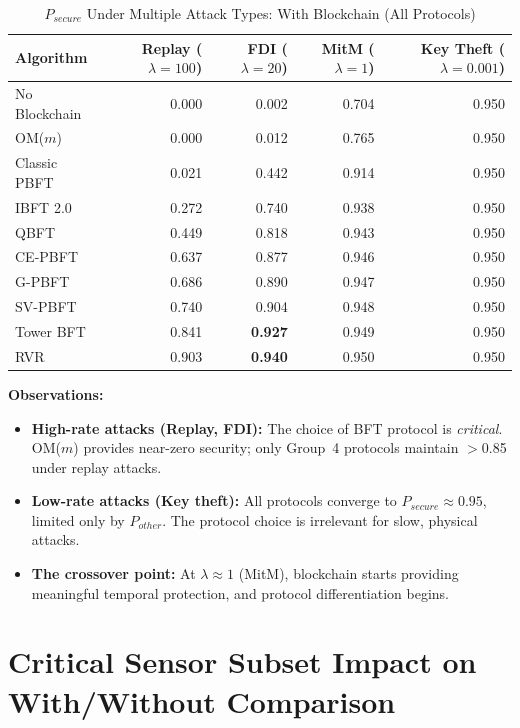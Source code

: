 \documentclass[10pt,twocolumn,letterpaper]{article}
\begin{document}
\begin{table}[t]
\caption{$P_{secure}$ Under Multiple Attack Types: With Blockchain (All Protocols)}
\label{tab:multi_attack}
\centering
\scriptsize
\begin{tabular}{@{}lrrrr@{}}
\toprule
\textbf{Algorithm} & \textbf{Replay ($\lambda=100$)} & \textbf{FDI ($\lambda=20$)} & \textbf{MitM ($\lambda=1$)} & \textbf{Key Theft ($\lambda=0.001$)} \\
\midrule
No Blockchain & 0.000 & 0.002 & 0.704 & 0.950 \\
\midrule
OM($m$) & 0.000 & 0.012 & 0.765 & 0.950 \\
Classic PBFT & 0.021 & 0.442 & 0.914 & 0.950 \\
IBFT 2.0 & 0.272 & 0.740 & 0.938 & 0.950 \\
QBFT & 0.449 & 0.818 & 0.943 & 0.950 \\
CE-PBFT & 0.637 & 0.877 & 0.946 & 0.950 \\
G-PBFT & 0.686 & 0.890 & 0.947 & 0.950 \\
SV-PBFT & 0.740 & 0.904 & 0.948 & 0.950 \\
Tower BFT & 0.841 & \textbf{0.927} & 0.949 & 0.950 \\
RVR & 0.903 & \textbf{0.940} & 0.950 & 0.950 \\
\bottomrule
\end{tabular}
\end{table}

\textbf{Observations:}
\begin{itemize}[leftmargin=*]
    \item \textbf{High-rate attacks (Replay, FDI):} The choice of BFT protocol is \emph{critical}. OM($m$) provides near-zero security; only Group~4 protocols maintain $>$0.85 under replay attacks.
    \item \textbf{Low-rate attacks (Key theft):} All protocols converge to $P_{secure} \approx 0.95$, limited only by $P_{other}$. The protocol choice is irrelevant for slow, physical attacks.
    \item \textbf{The crossover point:} At $\lambda \approx 1$ (MitM), blockchain starts providing meaningful temporal protection, and protocol differentiation begins.
\end{itemize}

\section{Critical Sensor Subset Impact on With/Without Comparison}
\label{sec:sensor_impact}
\end{document}
